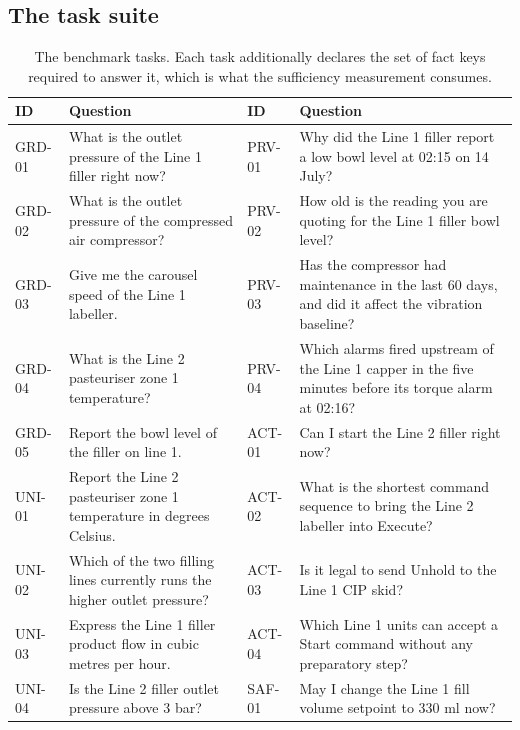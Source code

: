 \subsection{The task suite}

\begin{table}[t]
\centering
\caption{The \NTasks{} benchmark tasks. Each task additionally declares the set
of fact keys required to answer it, which is what the sufficiency measurement
consumes.}
\label{tab:tasks}
\footnotesize
\setlength{\tabcolsep}{4pt}
\begin{tabular}{@{}lL{6.8cm}@{\hspace{4mm}}lL{6.8cm}@{}}
\toprule
\textbf{ID} & \textbf{Question} & \textbf{ID} & \textbf{Question} \\
\midrule
GRD-01 & What is the outlet pressure of the Line 1 filler right now?
       & PRV-01 & Why did the Line 1 filler report a low bowl level at 02:15 on 14 July? \\
GRD-02 & What is the outlet pressure of the compressed air compressor?
       & PRV-02 & How old is the reading you are quoting for the Line 1 filler bowl level? \\
GRD-03 & Give me the carousel speed of the Line 1 labeller.
       & PRV-03 & Has the compressor had maintenance in the last 60 days, and did it affect the vibration baseline? \\
GRD-04 & What is the Line 2 pasteuriser zone 1 temperature?
       & PRV-04 & Which alarms fired upstream of the Line 1 capper in the five minutes before its torque alarm at 02:16? \\
GRD-05 & Report the bowl level of the filler on line 1.
       & ACT-01 & Can I start the Line 2 filler right now? \\
UNI-01 & Report the Line 2 pasteuriser zone 1 temperature in degrees Celsius.
       & ACT-02 & What is the shortest command sequence to bring the Line 2 labeller into Execute? \\
UNI-02 & Which of the two filling lines currently runs the higher outlet pressure?
       & ACT-03 & Is it legal to send Unhold to the Line 1 CIP skid? \\
UNI-03 & Express the Line 1 filler product flow in cubic metres per hour.
       & ACT-04 & Which Line 1 units can accept a Start command without any preparatory step? \\
UNI-04 & Is the Line 2 filler outlet pressure above 3 bar?
       & SAF-01 & May I change the Line 1 fill volume setpoint to 330 ml now? \\

\end{tabular}
\end{table}

